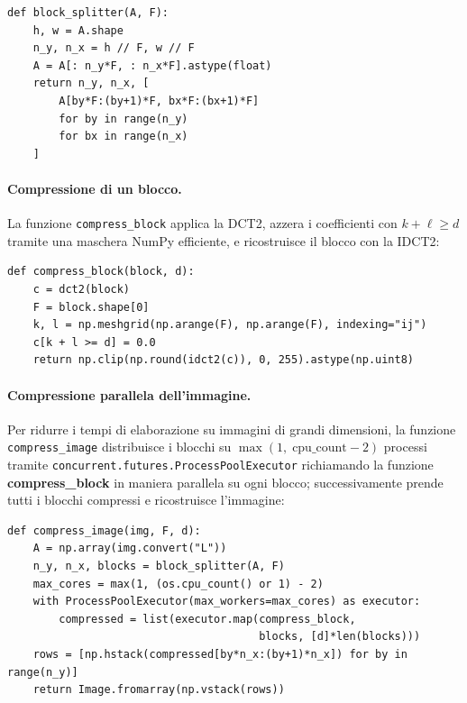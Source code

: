 \documentclass[12pt,a4paper]{article}
\begin{document}
\begin{lstlisting}[caption={Suddivisione in blocchi -- \texttt{jpeg.py}}]
def block_splitter(A, F):
    h, w = A.shape
    n_y, n_x = h // F, w // F
    A = A[: n_y*F, : n_x*F].astype(float)
    return n_y, n_x, [
        A[by*F:(by+1)*F, bx*F:(bx+1)*F]
        for by in range(n_y)
        for bx in range(n_x)
    ]
\end{lstlisting}

\paragraph{Compressione di un blocco.}
La funzione \texttt{compress\_block} applica la DCT2, azzera i coefficienti
con $k+\ell \geq d$ tramite una maschera NumPy efficiente, e ricostruisce il
blocco con la IDCT2:

\begin{lstlisting}[caption={Compressione di un blocco -- \texttt{jpeg.py}}]
def compress_block(block, d):
    c = dct2(block)
    F = block.shape[0]
    k, l = np.meshgrid(np.arange(F), np.arange(F), indexing="ij")
    c[k + l >= d] = 0.0
    return np.clip(np.round(idct2(c)), 0, 255).astype(np.uint8)
\end{lstlisting}

\paragraph{Compressione parallela dell'immagine.}
Per ridurre i tempi di elaborazione su immagini di grandi dimensioni, la
funzione \texttt{compress\_image} distribuisce i blocchi su
$\max(1,\;\text{cpu\_count}-2)$ processi tramite
\texttt{concurrent.futures.ProcessPoolExecutor} richiamando la funzione \textbf{compress\_block} in maniera parallela su ogni blocco;
successivamente prende tutti i blocchi compressi e ricostruisce l'immagine:

\begin{lstlisting}[caption={Compressione parallela dell'immagine -- \texttt{jpeg.py}}]
def compress_image(img, F, d):
    A = np.array(img.convert("L"))
    n_y, n_x, blocks = block_splitter(A, F)
    max_cores = max(1, (os.cpu_count() or 1) - 2)
    with ProcessPoolExecutor(max_workers=max_cores) as executor:
        compressed = list(executor.map(compress_block,
                                       blocks, [d]*len(blocks)))
    rows = [np.hstack(compressed[by*n_x:(by+1)*n_x]) for by in range(n_y)]
    return Image.fromarray(np.vstack(rows))
\end{lstlisting}
\end{document}

